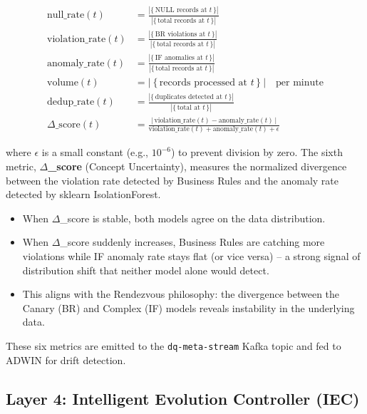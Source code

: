 \begin{align}
\text{null\_rate}(t) &= \frac{|\{\,\text{NULL records at }t\,\}|}{|\{\,\text{total records at }t\,\}|} \label{eq:null_rate} \\[6pt]
\text{violation\_rate}(t) &= \frac{|\{\,\text{BR violations at }t\,\}|}{|\{\,\text{total records at }t\,\}|} \label{eq:violation_rate} \\[6pt]
\text{anomaly\_rate}(t) &= \frac{|\{\,\text{IF anomalies at }t\,\}|}{|\{\,\text{total records at }t\,\}|} \label{eq:anomaly_rate} \\[6pt]
\text{volume}(t) &= |\ \{\,\text{records processed at }t\,\}\ | \quad \text{per minute} \label{eq:volume} \\[6pt]
\text{dedup\_rate}(t) &= \frac{|\{\,\text{duplicates detected at }t\,\}|}{|\{\,\text{total at }t\,\}|} \label{eq:dedup_rate} \\[6pt]
\Delta\_\text{score}(t) &= \frac{\big|\,\text{violation\_rate}(t) - \text{anomaly\_rate}(t)\,\big|}
                                   {\text{violation\_rate}(t) + \text{anomaly\_rate}(t) + \epsilon} \label{eq:delta_score}
\end{align}

\noindent where $\epsilon$ is a small constant (e.g., $10^{-6}$) to prevent division by zero. The sixth metric, \textbf{$\Delta$\_score} (Concept Uncertainty), measures the normalized divergence between the violation rate detected by Business Rules and the anomaly rate detected by sklearn IsolationForest.

\begin{itemize}
    \item When $\Delta$\_score is stable, both models agree on the data distribution.
    \item When $\Delta$\_score suddenly increases, Business Rules are catching more violations while IF anomaly rate stays flat (or vice versa) -- a strong signal of distribution shift that neither model alone would detect.
    \item This aligns with the Rendezvous philosophy: the divergence between the Canary (BR) and Complex (IF) models reveals instability in the underlying data.
\end{itemize}

These six metrics are emitted to the \texttt{dq-meta-stream} Kafka topic and fed to ADWIN for drift detection.

\subsection{Layer 4: Intelligent Evolution Controller (IEC)}

